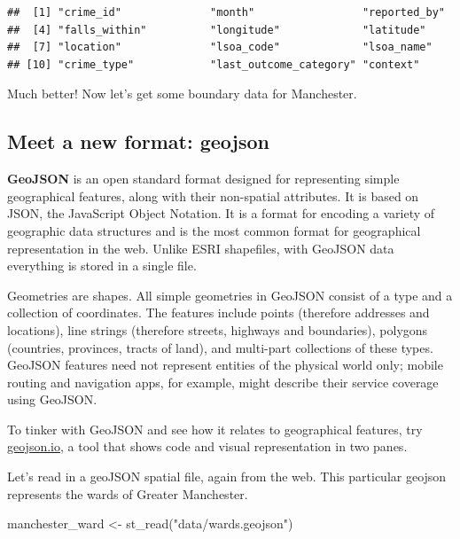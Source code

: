 \documentclass[
]{book}
\newenvironment{Shaded}{\begin{snugshade}}{\end{snugshade}}
\newcommand{\FunctionTok}[1]{\textcolor[rgb]{0.00,0.00,0.00}{#1}}
\newcommand{\NormalTok}[1]{#1}
\newcommand{\OtherTok}[1]{\textcolor[rgb]{0.56,0.35,0.01}{#1}}
\newcommand{\StringTok}[1]{\textcolor[rgb]{0.31,0.60,0.02}{#1}}
\begin{document}
\begin{verbatim}
##  [1] "crime_id"              "month"                 "reported_by"          
##  [4] "falls_within"          "longitude"             "latitude"             
##  [7] "location"              "lsoa_code"             "lsoa_name"            
## [10] "crime_type"            "last_outcome_category" "context"
\end{verbatim}

Much better! Now let's get some boundary data for Manchester.

\hypertarget{meet-a-new-format-geojson}{%
\subsection{Meet a new format: geojson}\label{meet-a-new-format-geojson}}

\textbf{GeoJSON} is an open standard format designed for representing simple geographical features, along with their non-spatial attributes. It is based on JSON, the JavaScript Object Notation. It is a format for encoding a variety of geographic data structures and is the most common format for geographical representation in the web. Unlike ESRI shapefiles, with GeoJSON data everything is stored in a single file.

Geometries are shapes. All simple geometries in GeoJSON consist of a type and a collection of coordinates. The features include points (therefore addresses and locations), line strings (therefore streets, highways and boundaries), polygons (countries, provinces, tracts of land), and multi-part collections of these types. GeoJSON features need not represent entities of the physical world only; mobile routing and navigation apps, for example, might describe their service coverage using GeoJSON.

To tinker with GeoJSON and see how it relates to geographical features, try \url{geojson.io}, a tool that shows code and visual representation in two panes.

Let's read in a geoJSON spatial file, again from the web. This particular geojson represents the wards of Greater Manchester.

\begin{Shaded}
\begin{Highlighting}[]
\NormalTok{manchester\_ward }\OtherTok{\textless{}{-}} \FunctionTok{st\_read}\NormalTok{(}\StringTok{"data/wards.geojson"}\NormalTok{)}
\end{Highlighting}
\end{Shaded}
\end{document}
